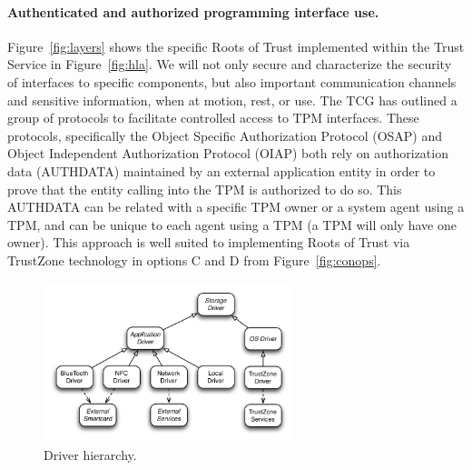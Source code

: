 \documentclass[10pt,letterpaper]{article}
\begin{document}
\paragraph{Authenticated and authorized programming interface use.} Figure~\ref{fig:layers} shows the specific Roots of Trust implemented within the Trust Service in Figure~\ref{fig:hla}. We will not only secure and characterize the security of interfaces to specific components, but also important communication channels and sensitive information, when at motion, rest, or use.  The TCG has outlined a group of protocols to facilitate controlled access to TPM interfaces.  These protocols, specifically the Object Specific Authorization Protocol (OSAP) and Object Independent Authorization Protocol (OIAP) both rely on authorization data (AUTHDATA) maintained by an external application entity in order to prove that the entity calling into the TPM is authorized to do so.  This AUTHDATA can be related with a specific TPM owner or a system agent using a TPM, and can be unique to each agent using a TPM (a TPM will only have one owner).  This approach is well suited to implementing Roots of Trust via TrustZone technology in options C and D from Figure~\ref{fig:conops}.

\begin{figure}
\vspace{-0.2in}
\centerline{\includegraphics[width=0.65\textwidth]{./images/hierarchy.pdf}}
\vspace{-0.1in}
\caption{Driver hierarchy.}
\label{fig:hierarchy}
\end{figure}
\end{document}
